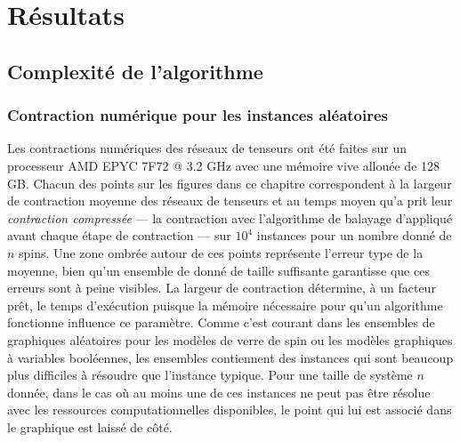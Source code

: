 \begin{comment}
\end{comment}

\part{Résultats}\label{part:results}

\chapter{Complexité de l'algorithme}\label{ch:results}


\section{Contraction numérique pour les instances aléatoires}\label{sec:results-random_instances}
Les contractions numériques des réseaux de tenseurs ont été faites sur un processeur AMD EPYC 7F72 @ 3.2 GHz avec une mémoire vive allouée de 128 GB.
Chacun des points sur les figures dans ce chapitre correspondent à la largeur de contraction moyenne des réseaux de tenseurs et au temps moyen qu'a prit leur \emph{contraction compressée} --- la contraction avec l'algorithme de balayage d'appliqué avant chaque étape de contraction --- sur $10^4$ instances pour un nombre donné de $n$ spins.
Une zone ombrée autour de ces points représente l'erreur type de la moyenne, bien qu'un ensemble de donné de taille suffisante garantisse que ces erreurs sont à peine visibles.
La largeur de contraction détermine, à un facteur prêt, le temps d'exécution puisque la mémoire nécessaire pour qu'un algorithme fonctionne influence ce paramètre.
Comme c'est courant dans les ensembles de graphiques aléatoires pour les modèles de verre de spin ou les modèles graphiques à variables booléennes, les ensembles contiennent des instances qui sont beaucoup plus difficiles à résoudre que l'instance typique.
Pour une taille de système $n$ donnée, dans le cas où au moins une de ces instances ne peut pas être résolue avec les ressources computationnelles disponibles, le point qui lui est associé dans le graphique est laissé de côté.

